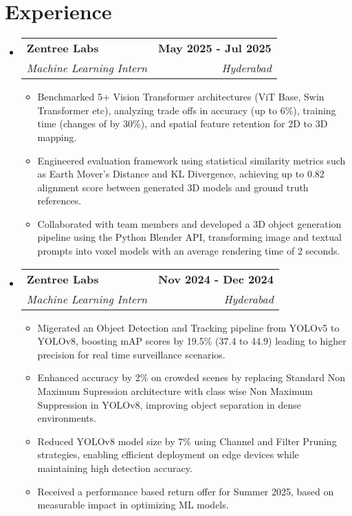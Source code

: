 \documentclass[letterpaper,11pt]{article}
\makeatletter
\newcommand{\resumeItem}[1]{
  \item\small{
    {#1 \vspace{-2pt}}
  }
}
\newcommand{\resumeSubheading}[4]{
  \vspace{-2pt}\item
    \begin{tabular*}{1.0\textwidth}[t]{l@{\extracolsep{\fill}}r}
      \textbf{#1} & \textbf{\small #2} \\
      \textit{\small#3} & \textit{\small #4} \\
    \end{tabular*}\vspace{-7pt}
}
\newcommand{\resumeSubHeadingListStart}{\begin{itemize}[leftmargin=0.0in, label={}]}
\newcommand{\resumeSubHeadingListEnd}{\end{itemize}}
\newcommand{\resumeItemListStart}{\begin{itemize}}
\newcommand{\resumeItemListEnd}{\end{itemize}\vspace{-5pt}}
\makeatother
\begin{document}
\section{Experience}
  \resumeSubHeadingListStart

    \resumeSubheading
      {Zentree Labs}{May 2025 - Jul 2025}
      {Machine Learning Intern}{Hyderabad}
      \resumeItemListStart
        \resumeItem{Benchmarked 5+ Vision Transformer architectures (ViT Base, Swin Transformer etc), analyzing trade offs in accuracy (up to 6\%), training time (changes of by 30\%), and spatial feature retention for 2D to 3D mapping.}        
        \resumeItem{Engineered evaluation framework using statistical similarity metrics such as Earth Mover’s Distance and KL Divergence, achieving up to 0.82 alignment score between generated 3D models and ground truth references.}
        \resumeItem{ Collaborated with team members and developed a 3D object generation pipeline using the Python Blender API, transforming image and textual prompts into voxel models with an average rendering time of 2 seconds.}
    \resumeItemListEnd

    \resumeSubheading
      {Zentree Labs}{Nov 2024 - Dec 2024}
      {Machine Learning Intern }{Hyderabad}
      \resumeItemListStart
        \resumeItem{Migerated an Object Detection and Tracking pipeline from YOLOv5 to YOLOv8, boosting mAP scores by 19.5\% (37.4 to 44.9) leading to higher precision for real time surveillance scenarios.}
        \resumeItem{Enhanced accuracy by 2\% on crowded scenes by replacing Standard Non Maximum Supression architecture with class wise Non Maximum Suppression in YOLOv8, improving object separation in dense environments.}
        \resumeItem{Reduced YOLOv8 model size by 7\% using Channel and Filter Pruning strategies, enabling efficient deployment on edge devices while maintaining high detection accuracy.}
        \resumeItem{Received a performance based return offer for Summer 2025, based on measurable impact in optimizing ML models.}

      \resumeItemListEnd
    
  \resumeSubHeadingListEnd
\vspace{-14pt}

\end{document}
